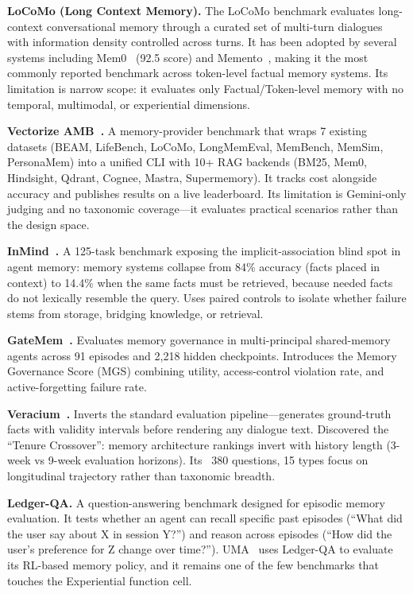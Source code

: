 \textbf{LoCoMo (Long Context Memory).} The LoCoMo benchmark evaluates long-context conversational memory through a curated set of multi-turn dialogues with information density controlled across turns. It has been adopted by several systems including Mem0~\cite{Unknown2025Mem0} (92.5 score) and Memento~\cite{Unknown2025Memento}, making it the most commonly reported benchmark across token-level factual memory systems. Its limitation is narrow scope: it evaluates only Factual/Token-level memory with no temporal, multimodal, or experiential dimensions.

\textbf{Vectorize AMB~\cite{Unknown2026VectorizeAMB}.} A memory-provider benchmark that wraps 7 existing datasets (BEAM, LifeBench, LoCoMo, LongMemEval, MemBench, MemSim, PersonaMem) into a unified CLI with 10+ RAG backends (BM25, Mem0, Hindsight, Qdrant, Cognee, Mastra, Supermemory). It tracks cost alongside accuracy and publishes results on a live leaderboard. Its limitation is Gemini-only judging and no taxonomic coverage---it evaluates practical scenarios rather than the design space.

\textbf{InMind~\cite{Unknown2026InMind}.} A 125-task benchmark exposing the implicit-association blind spot in agent memory: memory systems collapse from 84\% accuracy (facts placed in context) to 14.4\% when the same facts must be retrieved, because needed facts do not lexically resemble the query. Uses paired controls to isolate whether failure stems from storage, bridging knowledge, or retrieval.

\textbf{GateMem~\cite{Unknown2026GateMem}.} Evaluates memory governance in multi-principal shared-memory agents across 91 episodes and 2,218 hidden checkpoints. Introduces the Memory Governance Score (MGS) combining utility, access-control violation rate, and active-forgetting failure rate.

\textbf{Veracium~\cite{Unknown2026Veracium}.} Inverts the standard evaluation pipeline---generates ground-truth facts with validity intervals before rendering any dialogue text. Discovered the ``Tenure Crossover'': memory architecture rankings invert with history length (3-week vs 9-week evaluation horizons). Its ~380 questions, 15 types focus on longitudinal trajectory rather than taxonomic breadth.

\textbf{Ledger-QA.} A question-answering benchmark designed for episodic memory evaluation. It tests whether an agent can recall specific past episodes (``What did the user say about X in session Y?'') and reason across episodes (``How did the user's preference for Z change over time?''). UMA~\cite{Unknown2026LearningtoRemember} uses Ledger-QA to evaluate its RL-based memory policy, and it remains one of the few benchmarks that touches the Experiential function cell.

